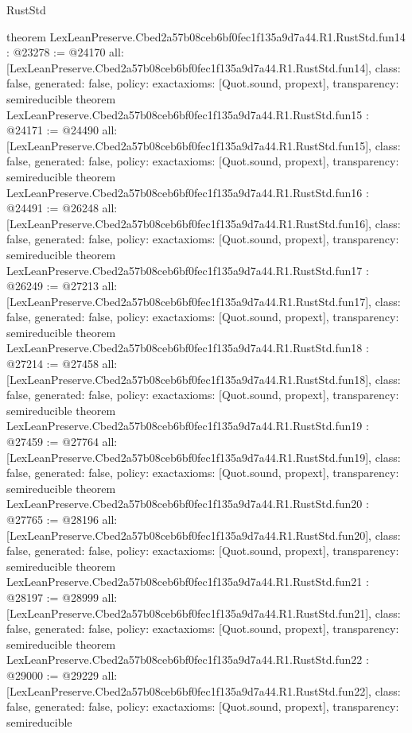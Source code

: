 \begin{lexlean}{RustStd}
\begin{coremodule}
{}
theorem LexLeanPreserve.Cbed2a57b08ceb6bf0fec1f135a9d7a44.R1.RustStd.fun14 : @23278 := @24170 {
  all: [LexLeanPreserve.Cbed2a57b08ceb6bf0fec1f135a9d7a44.R1.RustStd.fun14],
  class: false,
  generated: false,
  policy: exact{axioms: [Quot.sound, propext]},
  transparency: semireducible
}
theorem LexLeanPreserve.Cbed2a57b08ceb6bf0fec1f135a9d7a44.R1.RustStd.fun15 : @24171 := @24490 {
  all: [LexLeanPreserve.Cbed2a57b08ceb6bf0fec1f135a9d7a44.R1.RustStd.fun15],
  class: false,
  generated: false,
  policy: exact{axioms: [Quot.sound, propext]},
  transparency: semireducible
}
theorem LexLeanPreserve.Cbed2a57b08ceb6bf0fec1f135a9d7a44.R1.RustStd.fun16 : @24491 := @26248 {
  all: [LexLeanPreserve.Cbed2a57b08ceb6bf0fec1f135a9d7a44.R1.RustStd.fun16],
  class: false,
  generated: false,
  policy: exact{axioms: [Quot.sound, propext]},
  transparency: semireducible
}
theorem LexLeanPreserve.Cbed2a57b08ceb6bf0fec1f135a9d7a44.R1.RustStd.fun17 : @26249 := @27213 {
  all: [LexLeanPreserve.Cbed2a57b08ceb6bf0fec1f135a9d7a44.R1.RustStd.fun17],
  class: false,
  generated: false,
  policy: exact{axioms: [Quot.sound, propext]},
  transparency: semireducible
}
theorem LexLeanPreserve.Cbed2a57b08ceb6bf0fec1f135a9d7a44.R1.RustStd.fun18 : @27214 := @27458 {
  all: [LexLeanPreserve.Cbed2a57b08ceb6bf0fec1f135a9d7a44.R1.RustStd.fun18],
  class: false,
  generated: false,
  policy: exact{axioms: [Quot.sound, propext]},
  transparency: semireducible
}
theorem LexLeanPreserve.Cbed2a57b08ceb6bf0fec1f135a9d7a44.R1.RustStd.fun19 : @27459 := @27764 {
  all: [LexLeanPreserve.Cbed2a57b08ceb6bf0fec1f135a9d7a44.R1.RustStd.fun19],
  class: false,
  generated: false,
  policy: exact{axioms: [Quot.sound, propext]},
  transparency: semireducible
}
theorem LexLeanPreserve.Cbed2a57b08ceb6bf0fec1f135a9d7a44.R1.RustStd.fun20 : @27765 := @28196 {
  all: [LexLeanPreserve.Cbed2a57b08ceb6bf0fec1f135a9d7a44.R1.RustStd.fun20],
  class: false,
  generated: false,
  policy: exact{axioms: [Quot.sound, propext]},
  transparency: semireducible
}
theorem LexLeanPreserve.Cbed2a57b08ceb6bf0fec1f135a9d7a44.R1.RustStd.fun21 : @28197 := @28999 {
  all: [LexLeanPreserve.Cbed2a57b08ceb6bf0fec1f135a9d7a44.R1.RustStd.fun21],
  class: false,
  generated: false,
  policy: exact{axioms: [Quot.sound, propext]},
  transparency: semireducible
}
theorem LexLeanPreserve.Cbed2a57b08ceb6bf0fec1f135a9d7a44.R1.RustStd.fun22 : @29000 := @29229 {
  all: [LexLeanPreserve.Cbed2a57b08ceb6bf0fec1f135a9d7a44.R1.RustStd.fun22],
  class: false,
  generated: false,
  policy: exact{axioms: [Quot.sound, propext]},
  transparency: semireducible
}
\end{coremodule}
\end{lexlean}

